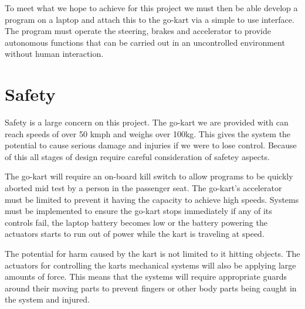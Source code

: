 To meet what we hope to achieve for this project we must then be able develop a program on a laptop and attach this to the go-kart via a simple to use interface. The program must operate the steering, brakes and accelerator to provide autonomous functions that can be carried out in an uncontrolled environment without human interaction. 

\section{Safety}
Safety is a large concern on this project. The go-kart we are provided with can reach speeds of over 50 kmph and weighs over 100kg. This gives the system the potential to cause serious damage and injuries if we were to lose control. Because of this all stages of design require careful consideration of safetey aspects.

The go-kart will require an on-board kill switch to allow programs to be quickly aborted mid test by a person in the passenger seat. The go-kart's accelerator must be limited to prevent it having the capacity to achieve high speeds. Systems must be implemented to ensure the go-kart stops immediately if any of its controls fail, the laptop battery becomes low or the battery powering the actuators starts to run out of power while the kart is traveling at speed.

The potential for harm caused by the kart is not limited to it hitting objects. The actuators for controlling the karts mechanical systems will also be applying large amounts of force. This means that the systems will require appropriate guards around their moving parts to prevent fingers or other body parts being caught in the system and injured.
